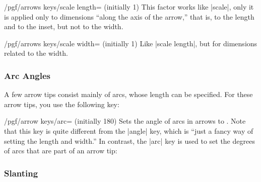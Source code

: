 \begin{key}{/pgf/arrows keys/scale length= (initially 1)}
  This factor works like |scale|, only it is applied only to
  dimensions ``along the axis of the arrow,'' that is, to the length
  and to the inset, but not to the width. 
\begin{codeexample}[]
\end{codeexample}  
\end{key}

\begin{key}{/pgf/arrows keys/scale width= (initially 1)}
  Like |scale length|, but for dimensions related to the width.
\begin{codeexample}[]
\end{codeexample}  
\end{key}


\subsubsection{Arc Angles}

A few arrow tips consist mainly of arcs, whose length can be
specified. For these arrow tips, you use the following key:

\begin{key}{/pgf/arrow keys/arc= (initially 180)}
  Sets the angle of arcs in arrows to . Note that this key
  is quite different from the |angle| key, which is ``just a
  fancy way of setting the length and width.'' In contrast, the |arc|
  key is used to set the degrees of arcs that are part of an arrow
  tip:
\begin{codeexample}[]
\end{codeexample}  
\end{key}


\subsubsection{Slanting}

